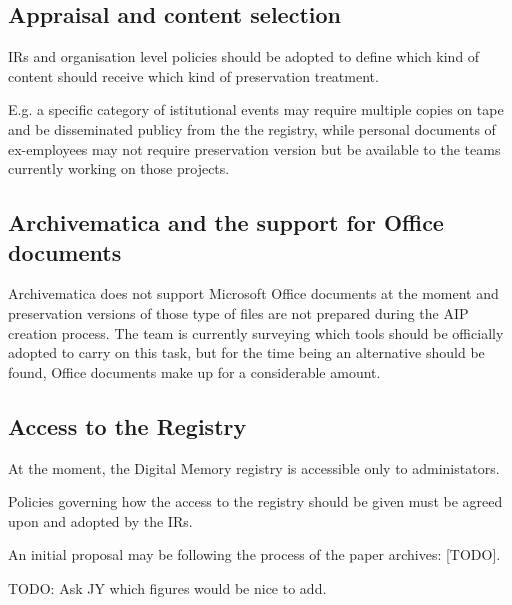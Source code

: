 \documentclass[11pt]{IEEEtran}
\begin{document}
\subsection{Appraisal and content selection}

IRs and organisation level policies should be adopted to define which kind of content should receive which kind of preservation treatment.

E.g. a specific category of istitutional events may require multiple copies on tape and be disseminated publicy from the the registry, while personal documents of ex-employees may not require preservation version but be available to the teams currently working on those projects.


\subsection{Archivematica and the support for Office documents}
Archivematica does not support Microsoft Office documents at the moment and preservation versions of those type of files are not prepared during the AIP creation process.
The team is currently surveying which tools should be officially adopted to carry on this task, but for the time being an alternative should be found, Office documents make up for a considerable amount.

\subsection{Access to the Registry}
At the moment, the Digital Memory registry is accessible only to administators.

Policies governing how the access to the registry should be given must be agreed upon and adopted by the IRs.

An initial proposal may be following the process of the paper archives: [TODO].

TODO: Ask JY which figures would be nice to add.



\end{document}
